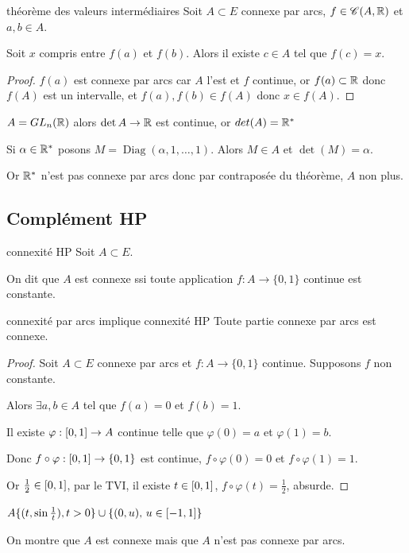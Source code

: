 \begin{theoreme}{théorème des valeurs intermédiaires }{}
    Soit $A \subset E$ connexe par arcs, $f \in \mathscr C(A, \mathbb{R})$ et $a, b \in A$.

    Soit $x$ compris entre $f(a)$ et $f(b)$. Alors il existe $c \in A$ tel que $f(c) = x$.
    
\end{theoreme}


\begin{proof}
    $f(a)$ est connexe par arcs car $A$ l'est et $f$ continue, or $f(a) \subset \mathbb{R}$ donc 
    $f(A)$ est un intervalle, et $f(a), f(b) \in f(A)$ donc $x \in f(A)$. 
\end{proof}

\begin{exemple}
    $A = GL_n(\mathbb{R})$ alors $\det A \to \mathbb{R}$ est continue, or $det(A) = \mathbb{R}^*$

    Si $\alpha \in \mathbb{R}^*$ posons $M = \operatorname{Diag}(\alpha, 1, \ldots, 1)$. 
    Alors $M \in A$ et $\det(M) = \alpha$.

    Or $\mathbb{R}^*$ n'est pas connexe par arcs donc par contraposée du théorème, $A$ non plus. 
\end{exemple}

\subsection{Complément HP}

\begin{definition}{connexité HP}{}
    Soit $A \subset E$. 

    On dit que $A$ est connexe ssi toute application $f : A \to \{0, 1\}$ continue est constante. 

\end{definition}

\begin{proposition}{connexité par arcs implique connexité HP}{}
    Toute partie connexe par arcs est connexe. 
\end{proposition}


\begin{proof}
    Soit $A \subset E$ connexe par arcs et $f : A \to \{0, 1\}$ continue. Supposons $f$ non constante. 

    Alors $\exists a, b \in A$ tel que $f(a) = 0$ et $f(b) = 1$.

    Il existe $\varphi : \left[0, 1\right] \to A$ continue telle que $\varphi(0) = a$ et $\varphi(1) = b$.

    Donc $f \circ \varphi : \left[0, 1\right] \to \{0, 1\}$ est continue, $f \circ \varphi(0) = 0$ et $f \circ \varphi (1) = 1$. 

    Or $\frac 1 2 \in \left[0, 1\right]$, par le TVI, il existe $t \in \left[0, 1\right]$, $f \circ \varphi (t) = \frac 1 2$, absurde. 
    
\end{proof}

\begin{exemple}
    $A \{(t, \sin \frac 1 t), t > 0\} \cup \{(0, u), \, u \in \left[-1, 1\right]\}$

    On montre que $A$ est connexe mais que $A$ n'est pas connexe par arcs.
\end{exemple}
